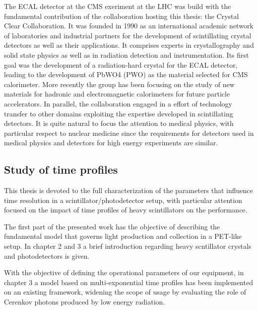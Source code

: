The ECAL detector at the CMS exeriment at the LHC was build with the fundamental contribution of the collaboration hosting this thesis: the Crystal Clear Collaboration. It was founded in 1990 as an international academic network of laboratories and industrial partners for the development of scintillating crystal detectors as well as their applications. It comprises experts in crystallography and solid state physics as well as in radiation detection and instrumentation. 
Its first goal was the development of a radiation-hard crystal for the ECAL detector, leading to the development of PbWO4 (PWO) as the material selected for CMS calorimeter. More recently the group has been focusing on the study of new materials for hadronic and electromagnetic calorimeters for future particle accelerators.
In parallel, the collaboration engaged in a effort of technology transfer to other domains exploiting the expertise developed in scintillating detectors. It is quite natural to focus the attention to medical physics, with particular respect to nuclear medicine since the requirements for detectors used in medical physics and detectors for high energy experiments are similar.


\subsection{Study of time profiles}

This thesis is devoted to the full characterization of the parameters that influence time resolution in a scintillator/photodetector setup, with particular attention focused on the impact of time profiles of heavy scintillators on the performance.

The first part of the presented work has the objective of describing the fundamental model that governs light production and collection in a PET-like setup.
In chapter 2 and 3 a brief introduction regarding heavy scntillator crystals and photodetectors is given.

With the objective of defining the operational parameters of our equipment, in chapter 3 a model based on multi-exponential time profiles has been implemented on an existing framework, widening the scope of usage by evaluating the role of Cerenkov photons produced by low energy radiation.

